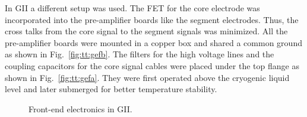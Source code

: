 In GII a different setup was used. The FET for the core electrode was incorporated into the pre-amplifier boards like the segment electrodes. Thus, the cross talks from the core signal to the segment signals was minimized. All the pre-amplifier boards were mounted in a copper box and shared a common ground as shown in Fig.~\ref{fig:tt:gefb}. The filters for the high voltage lines and the coupling capacitors for the core signal cables were placed under the top flange as shown in Fig.~\ref{fig:tt:gefa}. They were first operated above the cryogenic liquid level and later submerged for better temperature stability.
\begin{figure}[tbhp]
  \centering
  \hfil%
  \caption{Front-end electronics in GII.}
  \label{fig:tt:gef}
\end{figure}

